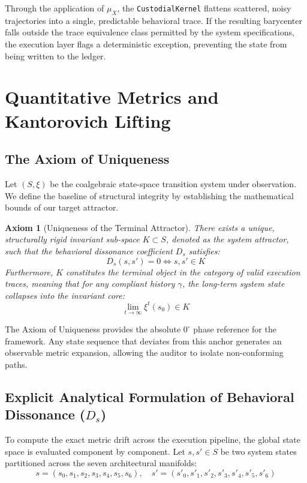 \documentclass[11pt,a4paper]{article}
\newtheorem{axiom}[theorem]{Axiom}
\begin{document}
Through the application of $\mu_X$, the \texttt{CustodialKernel} flattens scattered, noisy trajectories into a single, predictable behavioral trace. If the resulting barycenter falls outside the trace equivalence class permitted by the system specifications, the execution layer flags a deterministic exception, preventing the state from being written to the ledger.

\section{Quantitative Metrics and Kantorovich Lifting}

\subsection{The Axiom of Uniqueness}
Let $(S, \xi)$ be the coalgebraic state-space transition system under observation. We define the baseline of structural integrity by establishing the mathematical bounds of our target attractor.

\begin{axiom}[Uniqueness of the Terminal Attractor]
There exists a unique, structurally rigid invariant sub-space $K \subset S$, denoted as the system attractor, such that the behavioral dissonance coefficient $D_s$ satisfies:
\begin{equation}
    D_s(s, s') = 0 \iff s, s' \in K
\end{equation}
Furthermore, $K$ constitutes the terminal object in the category of valid execution traces, meaning that for any compliant history $\gamma$, the long-term system state collapses into the invariant core:
\begin{equation}
    \lim_{t \to \infty} \xi^t(s_0) \in K
\end{equation}
\end{axiom}

The Axiom of Uniqueness provides the absolute $0^\circ$ phase reference for the framework. Any state sequence that deviates from this anchor generates an observable metric expansion, allowing the auditor to isolate non-conforming paths.

\subsection{Explicit Analytical Formulation of Behavioral Dissonance ($D_s$)}
To compute the exact metric drift across the execution pipeline, the global state space is evaluated component by component. Let $s, s' \in S$ be two system states partitioned across the seven architectural manifolds:
\begin{equation}
    s = (s_0, s_1, s_2, s_3, s_4, s_5, s_6), \quad s' = (s'_0, s'_1, s'_2, s'_3, s'_4, s'_5, s'_6)
\end{equation}
\end{document}

